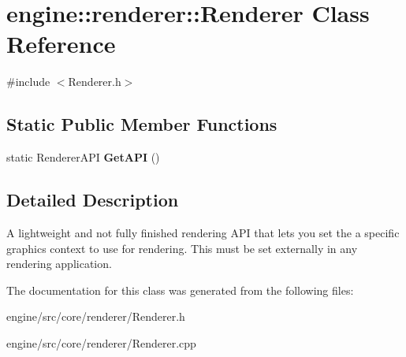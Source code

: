 \hypertarget{classengine_1_1renderer_1_1Renderer}{}\section{engine\+:\+:renderer\+:\+:Renderer Class Reference}
\label{classengine_1_1renderer_1_1Renderer}


{\ttfamily \#include $<$Renderer.\+h$>$}

\subsection*{Static Public Member Functions}
\begin{DoxyCompactItemize}
\item 
\mbox{\label{classengine_1_1renderer_1_1Renderer_aa2fc6d152284fd3c4e66b5ecbf8ab586}} 
static Renderer\+A\+PI {\bfseries Get\+A\+PI} ()
\end{DoxyCompactItemize}


\subsection{Detailed Description}
A lightweight and not fully finished rendering A\+PI that lets you set the a specific graphics context to use for rendering. This must be set externally in any rendering application. 

The documentation for this class was generated from the following files\+:\begin{DoxyCompactItemize}
\item 
engine/src/core/renderer/Renderer.\+h\item 
engine/src/core/renderer/Renderer.\+cpp\end{DoxyCompactItemize}
